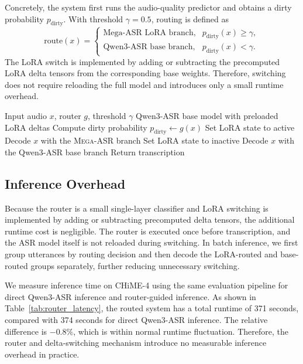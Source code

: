 \documentclass{article}
\begin{document}
Concretely, the system first runs the audio-quality predictor and obtains a
dirty probability $p_{\mathrm{dirty}}$. With threshold $\gamma=0.5$, routing is
defined as
\[
\mathrm{route}(x)=
\begin{cases}
\text{Mega-ASR LoRA branch}, & p_{\mathrm{dirty}}(x)\geq \gamma,\\
\text{Qwen3-ASR base branch}, & p_{\mathrm{dirty}}(x)<\gamma.
\end{cases}
\]
The LoRA switch is implemented by adding or subtracting the precomputed LoRA
delta tensors from the corresponding base weights. Therefore, switching does
not require reloading the full model and introduces only a small runtime
overhead.

\begin{algorithm}[t]
\caption{Router-guided LoRA delta switching for Qwen3-ASR}
\label{alg:router_delta_switch}
\begin{algorithmic}[1]
\Require Input audio $x$, router $g$, threshold $\gamma$
\Require Qwen3-ASR base model with preloaded LoRA deltas
\State Compute dirty probability $p_{\mathrm{dirty}} \leftarrow g(x)$
    \State Set LoRA state to active
    \State Decode $x$ with the \textsc{Mega-ASR} branch
\Else
    \State Set LoRA state to inactive
    \State Decode $x$ with the Qwen3-ASR base branch
\EndIf
\State Return transcription
\end{algorithmic}
\end{algorithm}



\subsection{Inference Overhead}

Because the router is a small single-layer classifier and LoRA switching is
implemented by adding or subtracting precomputed delta tensors, the additional
runtime cost is negligible. The router is executed once before transcription,
and the ASR model itself is not reloaded during switching. In batch inference,
we first group utterances by routing decision and then decode the LoRA-routed
and base-routed groups separately, further reducing unnecessary switching.

We measure inference time on CHiME-4 using the same evaluation pipeline for
direct Qwen3-ASR inference and router-guided inference. As shown in
Table~\ref{tab:router_latency}, the routed system has a total runtime of
371 seconds, compared with 374 seconds for direct Qwen3-ASR inference. The
relative difference is $-0.8\%$, which is within normal runtime fluctuation.
Therefore, the router and delta-switching mechanism introduce no measurable
inference overhead in practice.
\end{document}
